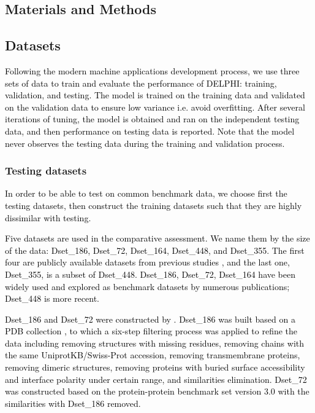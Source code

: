 \documentclass{bioinfo}
\newcommand{\myColor}{black}
\begin{document}
\begin{methods}
\section{Materials and Methods}
\subsection{Datasets}
\textcolor{\myColor}{Following the modern machine applications development process, we use three sets of data to train and evaluate the performance of DELPHI: training, validation, and testing. The model is trained on the training data and validated on the validation data to ensure low variance i.e. avoid overfitting. After several iterations of tuning, the model is obtained and ran on the independent testing data, and then performance on testing data is reported. Note that the model never observes the testing data during the training and validation process.}

\subsubsection{Testing datasets}\label{testing_data}
\textcolor{\myColor}{In order to be able to test on common benchmark data, we choose first the testing datasets, then construct the training datasets such that they are highly dissimilar with testing.}

\textcolor{\myColor}{Five datasets are used in the comparative assessment. We name them by the size of the data: Dset\_186, Dset\_72, Dset\_164, Dset\_448, and Dset\_355. The first four are publicly available datasets from previous studies \citep{murakami2010applying} \citep{dhole2014sequence} \citep{zhang2019scriber}, and the last one, Dset\_355, is a subset of Dset\_448. Dset\_186, Dset\_72, Dset\_164 have been widely used and explored as benchmark datasets by numerous publications; Dset\_448 is more recent.} 

\textcolor{\myColor}{
Dset\_186 and Dset\_72 were constructed by \cite{murakami2010applying}. Dset\_186 was built based on a PDB collection \citep{berman2002protein}, to which a six-step filtering process was applied to refine the data including removing structures with missing residues, removing chains with the same UniprotKB/Swiss-Prot accession, removing transmembrane proteins, removing dimeric structures, removing proteins with buried surface accessibility and interface polarity under certain range, and similarities elimination. Dset\_72 was constructed based on the protein-protein benchmark set version 3.0 \citep{hwang2008protein} with the similarities with Dset\_186 removed.
}


\end{methods}
\end{document}
